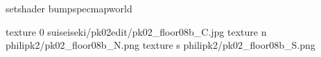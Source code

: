 setshader bumpspecmapworld

texture 0 suiseiseki/pk02edit/pk02_floor08b_C.jpg
texture n philipk2/pk02_floor08b_N.png
texture s philipk2/pk02_floor08b_S.png

